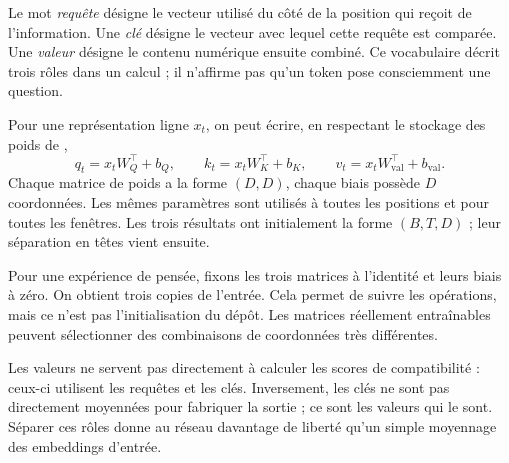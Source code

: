 



Le mot \emph{requête} désigne le vecteur utilisé du côté de la position qui reçoit de l'information. Une \emph{clé} désigne le vecteur avec lequel cette requête est comparée. Une \emph{valeur} désigne le contenu numérique ensuite combiné. Ce vocabulaire décrit trois rôles dans un calcul ; il n'affirme pas qu'un token pose consciemment une question.

Pour une représentation ligne $x_t$, on peut écrire, en respectant le stockage des poids de ,
\[
 q_t=x_tW_Q^\top+b_Q,\qquad
 k_t=x_tW_K^\top+b_K,\qquad
 v_t=x_tW_{\mathrm{val}}^\top+b_{\mathrm{val}}.
\]
Chaque matrice de poids a la forme $(D,D)$, chaque biais possède $D$ coordonnées. Les mêmes paramètres sont utilisés à toutes les positions et pour toutes les fenêtres. Les trois résultats ont initialement la forme $(B,T,D)$ ; leur séparation en têtes vient ensuite.

Pour une expérience de pensée, fixons les trois matrices à l'identité et leurs biais à zéro. On obtient trois copies de l'entrée. Cela permet de suivre les opérations, mais ce n'est pas l'initialisation du dépôt. Les matrices réellement entraînables peuvent sélectionner des combinaisons de coordonnées très différentes.

Les valeurs ne servent pas directement à calculer les scores de compatibilité : ceux-ci utilisent les requêtes et les clés. Inversement, les clés ne sont pas directement moyennées pour fabriquer la sortie ; ce sont les valeurs qui le sont. Séparer ces rôles donne au réseau davantage de liberté qu'un simple moyennage des embeddings d'entrée.

